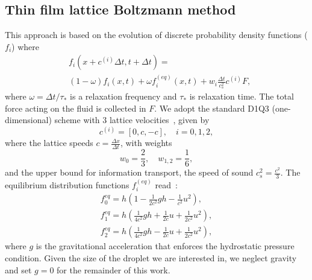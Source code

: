 \subsection{Thin film lattice Boltzmann method}\label{app:two}
This approach is based on the evolution of discrete probability density functions ($f_i$) where
\begin{equation}\label{eq:LBE_five}
    \begin{split}
        &f_i(x+c^{(i)}\Delta t,t+\Delta t) = \\
        &\left(1 - \omega\right) f_i(x,t) + \omega f_i^{(eq)}(x,t) + w_i \frac{\Delta t}{c_s^2} c^{(i)} F,
    \end{split}
\end{equation}
where $\omega = \Delta t/\tau_{\ast}$ is a relaxation frequency and $\tau_{\ast}$ is relaxation time. 
The total force acting on the fluid is collected in $F$.
We adopt the standard D1Q3 (one-dimensional) scheme with $3$ lattice velocities~\cite{krueger2017}, given by
\begin{equation}\label{eq:speeds_five}
c^{(i)}  = [0, c, -c], \quad i = 0, 1, 2,
\end{equation}
where the lattice speeds $c=\frac{\Delta x}{\Delta t}$, with weights
\begin{equation}
w_0 = \frac{2}{3},\quad w_{1,2} = \frac{1}{6},
\end{equation}
and the upper bound for information transport, the speed of sound $c_s^2=\frac{c^2}{3}$.
The equilibrium distribution functions $f_i^{(eq)}$ read~\cite{vanthangStudy1DLattice2010}:
\begin{gather}
    f_{0}^{eq} = h\left(1-\frac{1}{2c^2}gh - \frac{1}{c^2}u^2\right),\nonumber\\
    f_{1}^{eq} = h\left(\frac{1}{4c^2}gh + \frac{1}{2c}u + \frac{1}{2c^2}u^2\right)\label{eq:equilibria_five},\\
    f_{2}^{eq} = h\left(\frac{1}{4c^2}gh - \frac{1}{2c}u + \frac{1}{2c^2}u^2\right),\nonumber
\end{gather}
where $g$ is the gravitational acceleration that enforces the hydrostatic pressure condition. 
Given the size of the droplet we are interested in, we neglect gravity and set $g=0$ for the remainder of this work.

